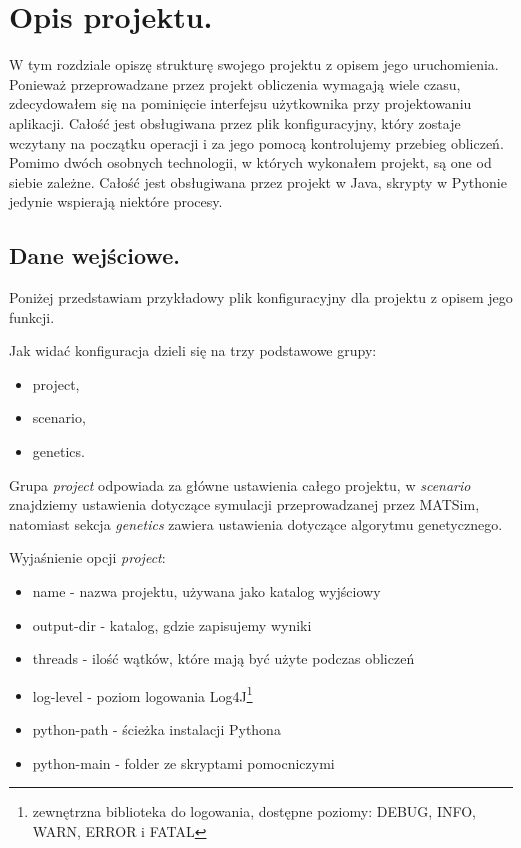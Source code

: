 \documentclass[twoside,12pt]{report}
\let\oldsection\chapter
\def\chapter{\cleardoublepage\oldsection}
\begin{document}
\chapter{Opis projektu.}\label{rozdz.opis} 

W tym rozdziale opiszę strukturę swojego projektu z opisem jego uruchomienia. Ponieważ przeprowadzane przez projekt obliczenia wymagają wiele czasu, zdecydowałem się na pominięcie interfejsu użytkownika przy projektowaniu aplikacji. Całość jest obsługiwana przez plik konfiguracyjny, który zostaje wczytany na początku operacji i za jego pomocą kontrolujemy przebieg obliczeń. Pomimo dwóch osobnych technologii, w których wykonałem projekt, są one od siebie zależne. Całość jest obsługiwana przez projekt w Java, skrypty w Pythonie jedynie wspierają niektóre procesy.

\section{Dane wejściowe.}

Poniżej przedstawiam przykładowy plik konfiguracyjny dla projektu z opisem jego funkcji.



\vspace*{15px}

Jak widać konfiguracja dzieli się na trzy podstawowe grupy:
\begin{itemize}
\item project,
\item scenario,
\item genetics.
\end{itemize}

\vspace*{15px}

Grupa \textit{project} odpowiada za główne ustawienia całego projektu, w \textit{scenario} znajdziemy ustawienia dotyczące symulacji przeprowadzanej przez MATSim, natomiast sekcja \textit{genetics} zawiera ustawienia dotyczące algorytmu genetycznego.

\vspace*{15px}

Wyjaśnienie opcji \textit{project}:
\begin{itemize}
\item name - nazwa projektu, używana jako katalog wyjściowy
\item output-dir - katalog, gdzie zapisujemy wyniki
\item threads - ilość wątków, które mają być użyte podczas obliczeń
\item log-level - poziom logowania Log4J\footnote{zewnętrzna biblioteka do logowania, dostępne poziomy: DEBUG, INFO, WARN, ERROR i FATAL}
\item python-path - ścieżka instalacji Pythona
\item python-main - folder ze skryptami pomocniczymi
\end{itemize}
\end{document}
